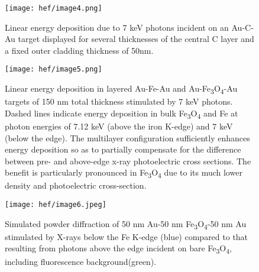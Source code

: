 \begin{figure}[h]
\caption{
Linear energy deposition due to 7 keV photons incident on an Au-C-Au
target displayed for several thicknesses of the central C layer and a
fixed outer cladding thickness of 50nm.
}
\label{fig:hef_image4}
\centering
\texttt{[image: hef/image4.png]}
\end{figure}

\begin{figure}[h]
\caption{
Linear energy deposition in layered Au-Fe-Au and
Au-Fe\textsubscript{3}O\textsubscript{4}-Au targets of 150 nm total
thickness stimulated by 7 keV photons. Dashed lines indicate energy
deposition in bulk Fe\textsubscript{3}O\textsubscript{4} and Fe at
photon energies of 7.12 keV (above the iron K-edge) and 7 keV (below the
edge). The multilayer configuration sufficiently enhances energy
deposition so as to partially compensate for the difference between pre-
and above-edge x-ray photoelectric cross sections. The benefit is
particularly pronounced in Fe\textsubscript{3}O\textsubscript{4} due to
its much lower density and photoelectric cross-section.
}
\label{fig:hef_image5}
\centering
\texttt{[image: hef/image5.png]}
\end{figure}

\begin{figure}[h]
\caption{
Simulated powder diffraction of 50 nm Au-50 nm
Fe\textsubscript{3}O\textsubscript{4}-50 nm Au stimulated by X-rays
below the Fe K-edge (blue) compared to that resulting from photons above
the edge incident on bare Fe\textsubscript{3}O\textsubscript{4},
including fluorescence background(green).
}
\label{fig:hef_image6}
\centering
\texttt{[image: hef/image6.jpeg]}
\end{figure}



